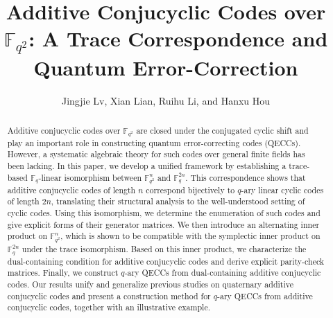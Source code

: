 \documentclass{aims}
\numberwithin{equation}{section}
\theoremstyle{definition}
\newcommand{\F}{\mathbb{F}}
\begin{document}
\title{Additive Conjucyclic Codes over $\F_{q^2}$: A Trace Correspondence and Quantum Error-Correction}

\author{%
  Jingjie Lv\corrauth,
  Xian Lian,
    Ruihu Li,
  and
  Hanxu Hou
}


\address{%
}




\begin{abstract}
Additive conjucyclic codes over $\F_{q^2}$ are closed under the conjugated cyclic shift and play an important role in constructing quantum error-correcting codes (QECCs). However, a systematic algebraic theory for such codes over general finite fields has been lacking. In this paper, we develop a unified framework by establishing a trace-based $\F_q$-linear isomorphism between $\F_{q^2}^n$ and $\F_q^{2n}$. This correspondence shows that additive conjucyclic codes of length $n$ correspond bijectively to $q$-ary linear cyclic codes of length $2n$, translating their structural analysis to the well-understood setting of cyclic codes. Using this isomorphism, we determine the enumeration of such codes and give explicit forms of their generator matrices.
We then introduce an alternating inner product on $\F_{q^2}^n$, which is shown to be compatible with the symplectic inner product on $\F_q^{2n}$ under the trace isomorphism. Based on this inner product, we characterize the dual-containing condition for additive conjucyclic codes and derive explicit parity-check matrices. Finally, we construct $q$-ary QECCs from dual-containing additive conjucyclic codes.
Our results unify and generalize previous studies on quaternary additive conjucyclic codes and present a construction method for $q$-ary QECCs from additive conjucyclic codes, together with an illustrative example.
\end{abstract}

\end{document}
